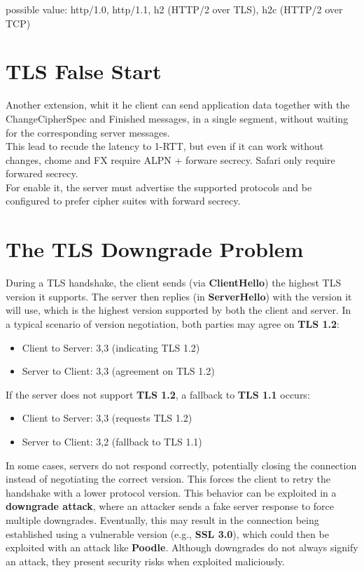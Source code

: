 possible value: http/1.0, http/1.1, h2 (HTTP/2 over TLS), h2c (HTTP/2 over TCP)

\section{TLS False Start}

Another extension, whit it he client can send application data together with the ChangeCipherSpec and Finished messages, in a single segment, without waiting for the corresponding server messages. \\
This lead to recude the latency to 1-RTT, but even if it can work without changes, chome and FX require ALPN + forware secrecy. Safari only require forwared secrecy. \\ 
For enable it, the server must advertise the supported protocols and be configured to prefer cipher suites with forward secrecy. 

\section{The TLS Downgrade Problem}

During a TLS handshake, the client sends (via \textbf{ClientHello}) the highest TLS version it supports. The server then replies (in \textbf{ServerHello}) with the version it will use, which is the highest version supported by both the client and server. In a typical scenario of version negotiation, both parties may agree on \textbf{TLS 1.2}:

\begin{itemize}
    \item Client to Server: 3,3 (indicating TLS 1.2)
    \item Server to Client: 3,3 (agreement on TLS 1.2)
\end{itemize}

If the server does not support \textbf{TLS 1.2}, a fallback to \textbf{TLS 1.1} occurs:

\begin{itemize}
    \item Client to Server: 3,3 (requests TLS 1.2)
    \item Server to Client: 3,2 (fallback to TLS 1.1)
\end{itemize}


In some cases, servers do not respond correctly, potentially closing the connection instead of negotiating the correct version. This forces the client to retry the handshake with a lower protocol version. This behavior can be exploited in a \textbf{downgrade attack}, where an attacker sends a fake server response to force multiple downgrades. Eventually, this may result in the connection being established using a vulnerable version (e.g., \textbf{SSL 3.0}), which could then be exploited with an attack like \textbf{Poodle}. Although downgrades do not always signify an attack, they present security risks when exploited maliciously. \\

